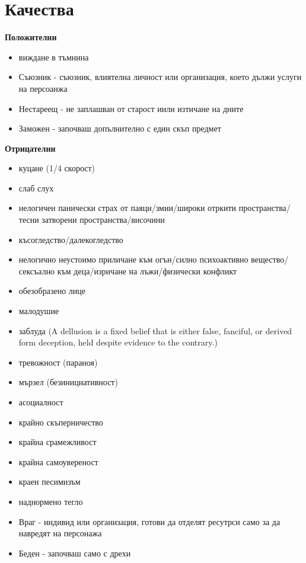 \section{Качества}

\textbf{Положителни}
\begin{itemize}
\item{виждане в тъмнина}
\item{Съюзник - съюзник, влиятелна личност или организация, което дължи услуги на персоанжа}
\item{Нестареещ - не заплашван от старост иили изтичане на дните}
\item{Заможен - започваш допълнително с един скъп предмет}
\end{itemize}

\vspace{0.7cm}
\textbf{Отрицателни}
\begin{itemize}
\item{куцане (1/4 скорост)}
\item{слаб слух}
\item{нелогичен панически страх от паяци/змии/широки отркити пространства/тесни затворени пространства/височини}
\item{късогледство/далекогледство}
\item{нелогично неустоимо приличане към огън/силно психоактивно вещество/сексъално към деца/изричане на лъжи/физически конфликт}
\item{обезобразено лице}
\item{малодушие}
\item{заблуда (A dellusion is a fixed belief that is either false, fanciful, or derived form deception, held despite evidence to the contrary.)}
\item{тревожност (параноя)}
\item{мързел (безинициативност)}
\item{асоциалност}
\item{крайно скъперничество}
\item{крайна срамежливост}
\item{крайна самоувереност}
\item{краен песимизъм}
\item{наднормено тегло}
\item{Враг - индивид или организация, готови да отделят ресутрси само за да навредят на персонажа}
\item{Беден - започваш само с дрехи}
\end{itemize}

